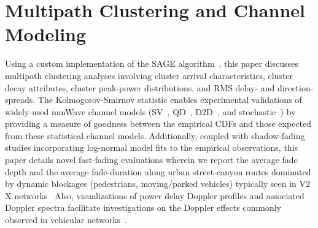 \documentclass[12pt, draftcls, onecolumn]{IEEEtran}
\begin{document}
\section{Multipath Clustering and Channel Modeling}\label{S5}
Using a custom implementation of the SAGE algorithm~\cite{SAGE}, this paper discusses multipath clustering analyses involving cluster arrival characteristics, cluster decay attributes, cluster peak-power distributions, and RMS delay- and direction-spreads. The Kolmogorov-Smirnov statistic enables experimental validations of widely-used mmWave channel models (SV~\cite{Indoor60G}, QD~\cite{QDC_NIST}, D$2$D~\cite{NISTModeling, D2DHumanBlockage}, and stochastic~\cite{Indoor60G}) by providing a measure of goodness between the empirical CDFs and those expected from these statistical channel models. Additionally, coupled with shadow-fading studies incorporating log-normal model fits to the empirical observations, this paper details novel fast-fading evaluations wherein we report the average fade depth and the average fade-duration along urban street-canyon routes dominated by dynamic blockages (pedestrians, moving/parked vehicles) typically seen in V$2$X networks~\cite{V2XBlockages} Also, visualizations of power delay Doppler profiles and associated Doppler spectra facilitate investigations on the Doppler effects commonly observed in vehicular networks~\cite{DopplerHST}.
\end{document}
